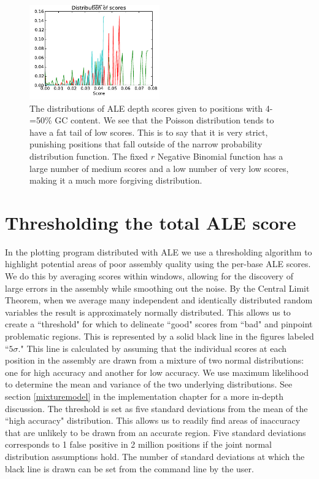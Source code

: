 \documentclass[phd,tocprelim]{cornell}
\begin{document}
\begin{figure}[hptb]
    \centerline{\includegraphics[width=0.5\textwidth]{figures/ALE/GC_depth_distribution_of_scores.png}}
    \caption[Distribution of scores using various distributions]{The distributions of ALE depth scores given to positions with 4-=50\% GC content. We see that the Poisson distribution tends to have a fat tail of low scores. This is to say that it is very strict, punishing positions that fall outside of the narrow probability distribution function. The fixed $r$ Negative Binomial function has a large number of medium scores and a low number of very low scores, making it a much more forgiving distribution.}\label{fig:GC5}
\end{figure}



\section{Thresholding the total ALE score} %
\label{sec:Thresholding the total ALE score}

In the plotting program distributed with ALE we use a thresholding algorithm to highlight potential areas of poor assembly quality using the per-base ALE scores. We do this by averaging scores within windows, allowing for the discovery of large errors in the assembly while smoothing out the noise. By the Central Limit Theorem, when we average many independent and identically distributed random variables the result is approximately normally distributed. This allows us to create a ``threshold" for which to delineate ``good" scores from ``bad" and pinpoint problematic regions. This is represented by a solid black line in the figures labeled ``$5\sigma$." This line is calculated by assuming that the individual scores at each position in the assembly are drawn from a mixture of two normal distributions: one for high accuracy and another for low accuracy. We use maximum likelihood to determine the mean and variance of the two underlying distributions. See section \ref{mixturemodel} in the implementation chapter for a more in-depth discussion. The threshold is set as five standard deviations from the mean of the ``high accuracy" distribution. This allows us to readily find areas of inaccuracy that are unlikely to be drawn from an accurate region. Five standard deviations corresponds to 1 false positive in 2 million positions if the joint normal distribution assumptions hold.  The number of standard deviations at which the black line is drawn can be set from the command line by the user.
\end{document}

